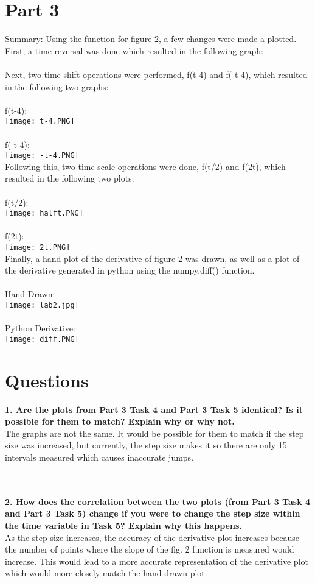 \documentclass[12pt]{report}
\begin{document}
\section{Part 3}
Summary: Using the function for figure 2, a few changes were made a plotted. First, a time reversal was done which resulted in the following graph:
\\
\\Next, two time shift operations were performed, f(t-4) and f(-t-4), which resulted in the following two graphs:
\\ \\f(t-4):
\\ \texttt{[image: t-4.PNG]}
\\ \\f(-t-4):
\\ \texttt{[image: -t-4.PNG]}
\\Following this, two time scale operations were done, f(t/2) and f(2t), which resulted in the following two plots:
\\ \\f(t/2):
\\ \texttt{[image: halft.PNG]}
\\ \\f(2t):
\\ \texttt{[image: 2t.PNG]}
\\Finally, a hand plot of the derivative of figure 2 was drawn, as well as a plot of the derivative generated in python using the numpy.diff() function.
\\ \\Hand Drawn:
\\ \texttt{[image: lab2.jpg]}
\\ \\Python Derivative:
\\ \texttt{[image: diff.PNG]}

\section{Questions}
\textbf{1. Are the plots from Part 3 Task 4 and Part 3 Task 5 identical? Is it possible for them to
match? Explain why or why not.}
\\The graphs are not the same. It would be possible for them to match if the step size was increased, but currently, the step size makes it so there are only 15 intervals measured which causes inaccurate jumps.

\\ \\ \textbf{2. How does the correlation between the two plots (from Part 3 Task 4 and Part 3 Task 5)
change if you were to change the step size within the time variable in Task 5? Explain why
this happens.}
\\As the step size increases, the accuracy of the derivative plot increases because the number of points where the slope of the fig. 2 function is measured would increase. This would lead to a more accurate representation of the derivative plot which would more closely match the hand drawn plot.
\end{document}
